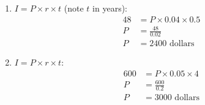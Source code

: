 \documentclass{article}
\begin{document}
\begin{enumerate}
  \item \( I = P \times r \times t \) (note \( t \) in years):
  \begin{align*}
  48 &= P \times 0.04 \times 0.5 \\
  P &= \frac{48}{0.02} \\
  P &= 2400 \text{ dollars}
  \end{align*}
  \vspace{1cm}
  
  \item \( I = P \times r \times t \):
  \begin{align*}
  600 &= P \times 0.05 \times 4 \\
  P &= \frac{600}{0.2} \\
  P &= 3000 \text{ dollars}
  \end{align*}
\end{enumerate}
\end{document}
